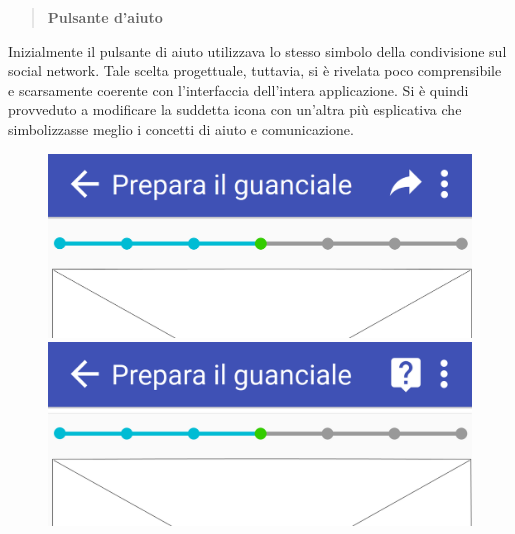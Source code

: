 \begin{quote}
	\textbf{Pulsante d'aiuto}
\end{quote}
Inizialmente il pulsante di aiuto utilizzava lo stesso simbolo della condivisione
sul social network.  Tale scelta progettuale, tuttavia, si è rivelata poco comprensibile
e scarsamente coerente con l'interfaccia dell'intera applicazione.  Si è quindi
provveduto a modificare la suddetta icona con un'altra più esplicativa
che simbolizzasse meglio i concetti di aiuto e comunicazione.
\begin{figure}[H]
	\begin{minipage}{.49\textwidth}
		\includegraphics[width=\textwidth]{img/modifiche/condividi_passo_old.png}
	\end{minipage}
	\begin{minipage}{.49\textwidth}
		\includegraphics[width=\textwidth]{img/modifiche/condividi_passo_new.png}
	\end{minipage}
\end{figure}

